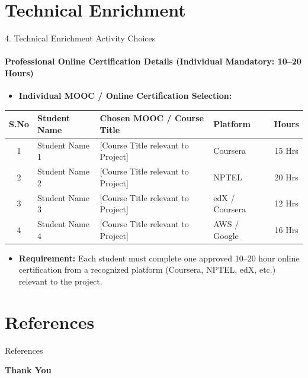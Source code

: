 \documentclass[aspectratio=169, 11pt]{beamer}
\begin{document}
\section{Technical Enrichment}
\begin{frame}{4. Technical Enrichment Activity Choices}
    \framesubtitle{Professional Online Certification Details (Individual Mandatory: 10--20 Hours)}
    \begin{itemize}
        \item \textbf{Individual MOOC / Online Certification Selection:}
    \end{itemize}
    \vspace{-0.1cm}
    \begin{table}
        \centering
        \footnotesize
        \renewcommand{\arraystretch}{1.15}
        \begin{tabular}{|c|p{2.8cm}|p{5.0cm}|p{2.3cm}|c|}
            \hline
            \textbf{S.No} & \textbf{Student Name} & \textbf{Chosen MOOC / Course Title} & \textbf{Platform} & \textbf{Hours} \\
            \hline
            1 & Student Name 1 & [Course Title relevant to Project] & Coursera & 15 Hrs \\
            \hline
            2 & Student Name 2 & [Course Title relevant to Project] & NPTEL & 20 Hrs \\
            \hline
            3 & Student Name 3 & [Course Title relevant to Project] & edX / Coursera & 12 Hrs \\
            \hline
            4 & Student Name 4 & [Course Title relevant to Project] & AWS / Google & 16 Hrs \\
            \hline
        \end{tabular}
    \end{table}
    \vspace{0.15cm}
    \begin{itemize}
        \item {\scriptsize \textbf{Requirement:} Each student must complete one approved 10--20 hour online certification from a recognized platform (Coursera, NPTEL, edX, etc.) relevant to the project.}
    \end{itemize}
\end{frame}

\section{References}
\begin{frame}[allowframebreaks]{References}
    
     
\end{frame}

\begin{frame}
    \centering    
    {\Huge \textbf{\textcolor{amritaMaroon}{Thank You}}}
\end{frame}
\end{document}

